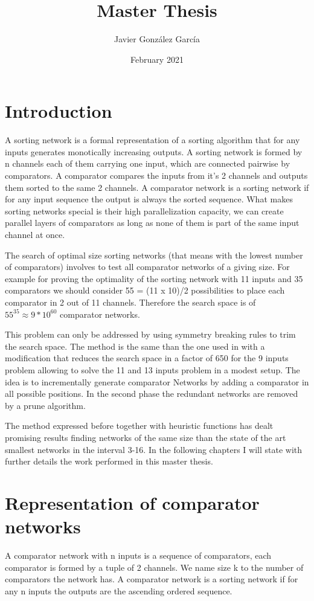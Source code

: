 \documentclass{article}
\title{Master Thesis}
\author{ Javier González García }
\date{February 2021}
\begin{document}
\maketitle

\section{Introduction}
A sorting network is a formal representation of a sorting algorithm that for any inputs generates
monotically increasing outputs. A sorting network is formed by n channels each of them carrying one input,
which are connected pairwise by comparators. A comparator compares the inputs from it's 2 channels and 
outputs them sorted to the same 2 channels. A comparator network is a sorting network if for any 
input sequence the output is always the sorted sequence. What makes sorting networks special is their
high parallelization capacity, we can create parallel layers of comparators as long as none of them is part of
the same input channel at once. 

The search of optimal size sorting networks (that means with the lowest number of comparators) involves
to test all comparator networks of a giving size. For example for proving the optimality of the sorting network
with 11 inputs and 35 comparators we should consider 55 = (11 x 10)/2 possibilities to place each comparator in 2 out of 11 channels. Therefore the search space is of  $55^{35} \approx 9 * 10^{60}$ comparator networks. 

This problem can only be addressed by using symmetry breaking rules to trim the search space. The method is the same than the one used in \cite{sortingnineinputs}with a modification that reduces the search space in a factor of 650 for the 9 inputs problem allowing to solve the 11 and 13 inputs problem in a modest setup. The idea is to incrementally generate comparator Networks by adding a comparator in all possible positions. In the second phase the redundant networks are removed by a prune algorithm.

The method expressed before together with heuristic functions has dealt promising results finding networks of the same size than the state of the art smallest networks in the interval 3-16. In the following chapters I will state with further details the work performed in this master thesis.

\section{Representation of comparator networks}
A comparator network with n inputs is a sequence of comparators, each comparator is formed by a tuple of 2 channels. We name size k to the number of comparators the network has. A comparator network is a sorting network if for any n inputs the outputs are the ascending ordered sequence. 
\end{document}
